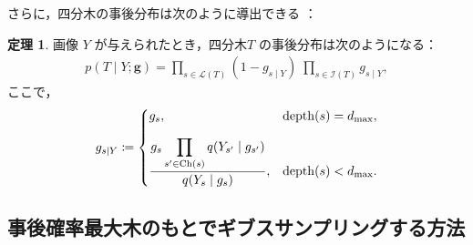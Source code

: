 \documentclass{jsarticle}
\theoremstyle{definition}
\newtheorem{thm}{定理}
\begin{document}
さらに，四分木の事後分布は次のように導出できる \cite{b1}：
\begin{thm}
  画像 $Y$ が与えられたとき，四分木$T$ の事後分布は次のようになる：
  \begin{align}
    p(T\mid Y;\bm{g})
    = \prod_{s\in\mathcal{L}(T)}(1 - g_{s\mid Y})
      \;\prod_{s\in\mathcal{I}(T)} g_{s\mid Y},
    \label{m's posterior}
  \end{align}
  ここで，
  \begin{eqnarray}
    g_{s\mid Y}\coloneqq
    \begin{dcases}
      g_{s}, & \mathrm{depth}(s) = d_{\mathrm{max}},\\[6pt]
      \displaystyle\frac{g_{s}
        \displaystyle\prod_{s'\in \mathrm{Ch}(s)}q(Y_{s'}\mid g_{s'})}
        {q(Y_s\mid g_s)}, & \mathrm{depth}(s) < d_{\mathrm{max}}.
    \end{dcases}
  \end{eqnarray}
  \label{posterior_dist_T}
\end{thm}

\subsection{事後確率最大木のもとでギブスサンプリングする方法}
\end{document}
